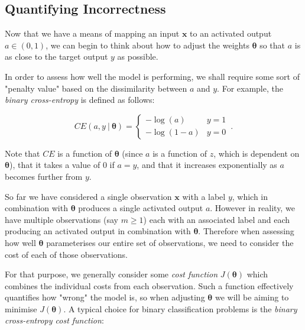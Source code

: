 \documentclass{article}[11pt]
\begin{document}
        
        
    \subsection{Quantifying Incorrectness} \label{sec:costfun}
        
        Now that we have a means of mapping an input $\mathbf{x}$ to an activated output $a \in (0, 1)$, we can begin to think about how to adjust the weights $\boldsymbol{\theta}$ so that $a$ is as close to the target output $y$ as possible.
        
        In order to assess how well the model is performing, we shall require some sort of "penalty value" based on the dissimilarity between $a$ and $y$. For example, the \textit{binary cross-entropy} is defined as follows:
        
        $$
        CE(a, y \ \vert \ \boldsymbol{\theta}) = \begin{cases}
            -\log(a) & y = 1 \\
            -\log(1-a) & y = 0
        \end{cases} \,.
        $$
        
        
        
        
        Note that $CE$ is a function of $\boldsymbol{\theta}$ (since $a$ is a function of $z$, which is dependent on $\boldsymbol{\theta}$), that it takes a value of 0 if $a = y$, and that it increases exponentially as $a$ becomes further from $y$.
        
        So far we have considered a single observation $\mathbf{x}$ with a label $y$, which in combination with $\boldsymbol{\theta}$ produces a single activated output $a$. However in reality, we have multiple observations (say $m \geq 1$) each with an associated label and each producing an activated output in combination with $\boldsymbol{\theta}$. Therefore when assessing how well $\boldsymbol{\theta}$ parameterises our entire set of observations, we need to consider the cost of each of those observations.
        
        For that purpose, we generally consider some \textit{cost function} $J(\boldsymbol{\theta})$ which combines the individual costs from each observation. Such a function effectively quantifies how "wrong" the model is, so when adjusting $\boldsymbol{\theta}$ we will be aiming to minimise $J(\boldsymbol{\theta})$. A typical choice for binary classification problems is the \textit{binary cross-entropy cost function}:
        
\end{document}
